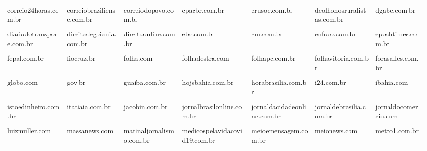 \begin{longtable}[t]{lllllll}
correio24horas.com.br & correiobraziliense.com.br & correiodopovo.com.br & cpacbr.com.br & crusoe.com.br & deolhonosruralistas.com.br & dgabc.com.br\\
\addlinespace
\cellcolor{gray!10}{diariocarioca.com} & \cellcolor{gray!10}{diariodepernambuco.com.br} & \cellcolor{gray!10}{diariodobrasilnoticias.com.br} & \cellcolor{gray!10}{diariodocentrodomundo.com.br} & \cellcolor{gray!10}{diariodolitoral.com.br} & \cellcolor{gray!10}{diariodopoder.com.br} & \cellcolor{gray!10}{diariodorio.com}\\
diariodotransporte.com.br & direitadegoiania.com.br & direitaonline.com.br & ebc.com.br & em.com.br & enfoco.com.br & epochtimes.com.br\\
\cellcolor{gray!10}{esmaelmorais.com.br} & \cellcolor{gray!10}{estadao.com.br} & \cellcolor{gray!10}{estado.sc.gov.br} & \cellcolor{gray!10}{estudosnacionais.com} & \cellcolor{gray!10}{exame.com} & \cellcolor{gray!10}{f5online.com.br} & \cellcolor{gray!10}{fapesp.br}\\
fepal.com.br & fiocruz.br & folha.com & folhadestra.com & folhape.com.br & folhavitoria.com.br & forasalles.com.br\\
\cellcolor{gray!10}{forbes.com.br} & \cellcolor{gray!10}{fpabramo.org.br} & \cellcolor{gray!10}{gazetabrasil.com.br} & \cellcolor{gray!10}{gazetadopovo.com.br} & \cellcolor{gray!10}{gazetapotiguar.com.br} & \cellcolor{gray!10}{gcmais.com.br} & \cellcolor{gray!10}{geledes.org.br}\\
\addlinespace
globo.com & gov.br & guaiba.com.br & hojebahia.com.br & horabrasilia.com.br & i24.com.br & ibahia.com\\
\cellcolor{gray!10}{iclnoticias.com.br} & \cellcolor{gray!10}{ig.com.br} & \cellcolor{gray!10}{infomoney.com.br} & \cellcolor{gray!10}{informeorwell.com} & \cellcolor{gray!10}{inteligenciafinanceira.com.br} & \cellcolor{gray!10}{intercept.com.br} & \cellcolor{gray!10}{istoe.com.br}\\
istoedinheiro.com.br & itatiaia.com.br & jacobin.com.br & jornalbrasilonline.com.br & jornaldacidadeonline.com.br & jornaldebrasilia.com.br & jornaldocomercio.com\\
\cellcolor{gray!10}{jornalggn.com.br} & \cellcolor{gray!10}{jornalopcao.com.br} & \cellcolor{gray!10}{jornalrazao.com} & \cellcolor{gray!10}{jota.info} & \cellcolor{gray!10}{jovempan.com.br} & \cellcolor{gray!10}{lance.com.br} & \cellcolor{gray!10}{leiaja.com}\\
luizmuller.com & massanews.com & matinaljornalismo.com.br & medicospelavidacovid19.com.br & meioemensagem.com.br & meionews.com & metro1.com.br\\

\end{longtable}
